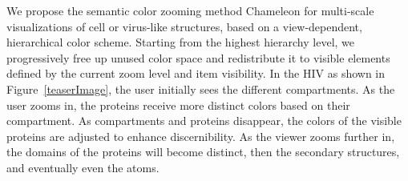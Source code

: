 \documentclass{egpubl}
\begin{document}
	
	
	We propose the semantic color zooming method Chameleon for multi-scale visualizations of cell or virus-like structures, based on a view-dependent, hierarchical color scheme.
	Starting from the highest hierarchy level, we progressively free up unused color space and redistribute it to visible elements defined by the current zoom level and item visibility.
	In the HIV as shown in Figure~\ref{teaserImage}, the user initially sees the different compartments. 
	As the user zooms in, the proteins receive more distinct colors based on their compartment. 
	As compartments and proteins disappear, the colors of the visible proteins are adjusted to enhance discernibility.  
	As the viewer zooms further in, the domains of the proteins will become distinct, then the secondary structures, and eventually even the atoms.%
	
\end{document}
